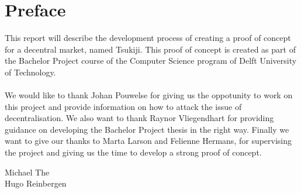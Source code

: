 \section{Preface}
This report will describe the development process of creating a proof of concept for a decentral market, named Tsukiji. 
This proof of concept is created as part of the Bachelor Project course of the Computer Science program of Delft University of Technology.\\
\\
We would like to thank Johan Pouwelse for giving us the oppotunity to work on this project and provide information on how to attack the issue of decentralisation. We also want to thank Raynor Vliegendhart for providing guidance on developing the Bachelor Project thesis in the right way. Finally we want to give our thanks to Marta Larson and Felienne Hermans, for supervising the project and giving us the time to develop a strong proof of concept.\\
\begin{flushright}
Michael The \\
Hugo Reinbergen
\end{flushright}